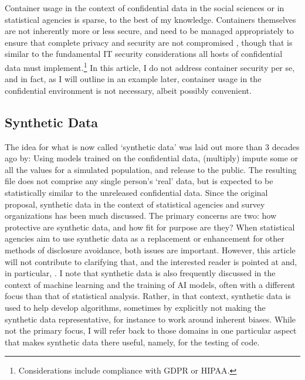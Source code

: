 \documentclass[inline]{hdsr}
\begin{document}
Container usage in the context of confidential data in the social sciences or in statistical agencies is sparse, to the best of my knowledge. Containers themselves are not inherently more or less secure, and need to be managed appropriately to ensure that complete privacy and security are not compromised \citep[see][]{souppaya_application_2017}, though that is  similar to the fundamental IT security considerations all hosts of confidential data must implement.\footnote{Considerations include compliance with \ac{GDPR} or \ac{HIPAA}.} In this article, I do not address container security per se, and in fact, as I will outline in an example later, container usage in the confidential environment is not necessary, albeit possibly convenient.  


\subsection{Synthetic Data}

The idea for what is now called `synthetic data' was laid out more than 3 decades ago by\citet{rubin_discussion_1993}: Using models trained on the confidential data, (multiply) impute some or all the values for a simulated population, and release to the public. The resulting file does not comprise any single person's `real' data, but is expected to be statistically similar to the unreleased confidential data. Since the original proposal, synthetic data in the context of statistical agencies and survey organizations has been much discussed. The primary concerns are two: how protective are synthetic data, and how fit for purpose are they? When statistical agencies aim to use synthetic data as a replacement or enhancement for other methods of disclosure avoidance, both issues are important. However, this article will not contribute to clarifying that, and the interested reader is pointed at \citet{drechslerDifferentialPrivacyGovernment2021,drechsler30YearsSynthetic2024,raghunathan_synthetic_2021,reiter_synthetic_2023} and, in particular, \citet{raghunathan_roadmap_2023b,raghu-nber-2024}. I note that synthetic data is also frequently discussed in the context of machine learning and the training of AI models, often with a different focus than that of statistical analysis. Rather, in that context, synthetic data is used to help develop algorithms, sometimes by explicitly not making the synthetic data representative, for instance to work around inherent biases. While not the primary focus, I will refer back to those domains in one particular aspect that makes synthetic data there useful, namely, for the testing of code. 
\end{document}

